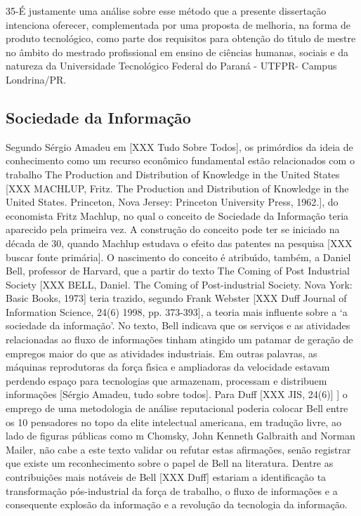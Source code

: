 \documentclass[
12pt,		%
openright,	%
twoside,  %
a4paper,			%
chapter=TITLE,		%
english,			%
french,				%
spanish,			%
brazil				%
]{USPSC-classe/USPSC_RedarTex}
\begin{document}
35-\'E justamente uma an\'alise sobre esse m\'etodo que a presente disserta\c{c}\~ao intenciona oferecer, complementada por uma proposta de melhoria, na forma de produto tecnol\'ogico, como parte dos requisitos para obten\c{c}\~ao do t\'{\i}tulo de mestre no \^ambito do mestrado profissional em ensino de ci\^encias humanas, sociais e da natureza da Universidade  Tecnol\'ogico  Federal do Paran\'a - UTFPR- Campus Londrina/PR.










\subsection[Sociedade da Informa\c{c}\~ao]{Sociedade da Informa\c{c}\~ao}\label{Sociedade da Informa\c{c}\~ao}
Segundo S\'ergio Amadeu em [XXX Tudo Sobre Todos], os prim\'ordios da ideia de conhecimento como um recurso econ\^omico fundamental est\~ao relacionados com o trabalho \textquotedbl The Production and Distribution of Knowledge in the United States [XXX MACHLUP, Fritz. The Production and Distribution of Knowledge in the United States. Princeton, Nova Jersey: Princeton University Press, 1962.], do economista Fritz Machlup, no qual o conceito de Sociedade da Informa\c{c}\~ao teria aparecido pela primeira vez. A constru\c{c}\~ao do conceito pode ter se iniciado na d\'ecada de 30, quando Machlup estudava o efeito das patentes na pesquisa [XXX buscar fonte prim\'aria]. O nascimento do conceito \'e atribu\'{\i}do, tamb\'em, a Daniel Bell, professor de Harvard, que a partir do texto \textquotedbl The Coming of Post Industrial Society [XXX BELL, Daniel. The Coming of Post-industrial Society. Nova York: Basic Books, 1973] teria trazido, segundo Frank Webster [XXX Duff Journal of Information Science, 24(6) 1998, pp. 373-393], \textquotedbl a teoria mais influente sobre a ‘a sociedade da informa\c{c}\~ao’. No texto, Bell indicava que os servi\c{c}os e as atividades relacionadas ao fluxo de informa\c{c}\~oes tinham atingido um patamar de gera\c{c}\~ao de empregos maior do que as atividades industriais. Em outras palavras, \textquotedbl as m\'aquinas reprodutoras da for\c{c}a f\'{\i}sica e ampliadoras da velocidade estavam perdendo espa\c{c}o para tecnologias que armazenam, processam e distribuem informa\c{c}\~oes [S\'ergio Amadeu, tudo sobre todos]. Para Duff [XXX JIS, 24(6)] ] o emprego de uma metodologia de an\'alise \textquotedbl reputacional poderia colocar Bell entre os 10 pensadores no topo da elite intelectual americana, em tradu\c{c}\~ao livre, \textquotedbl ao lado de figuras p\'ublicas como m Chomsky, John Kenneth Galbraith and Norman Mailer, n\~ao cabe a este texto validar ou refutar estas afirma\c{c}\~oes, sen\~ao registrar que existe um reconhecimento sobre o papel de Bell na literatura. Dentre as contribui\c{c}\~oes mais not\'aveis de Bell [XXX Duff] estariam a identifica\c{c}\~ao ta transforma\c{c}\~ao p\'os-industrial da for\c{c}a de trabalho, o fluxo de informa\c{c}\~oes e a consequente \textquotedbl explos\~ao da informa\c{c}\~ao e a \textquotedbl revolu\c{c}\~ao da tecnologia da informa\c{c}\~ao. 
\end{document}
